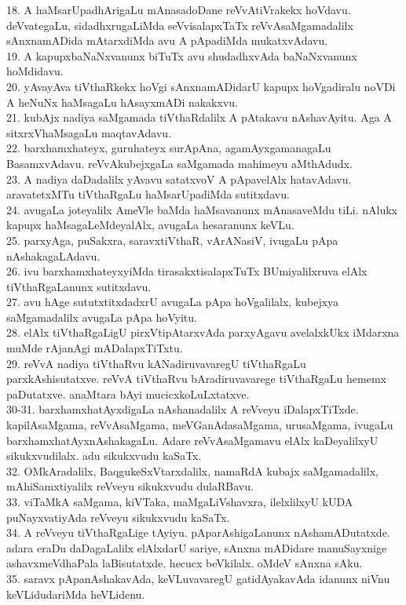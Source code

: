 \documentclass{article}
\begin{document}
18. A haMsarUpadhArigaLu mAnasadoDane reVvAtiVrakekx hoVdavu. deVvategaLu, sidadhxrugaLiMda seVvisalapxTaTx reVvAsaMgamadalilx sAnxnamADida mAtarxdiMda avu A pApadiMda mukatxvAdavu.\\
19. A kapupxbaNaNxvanunx biTuTx avu shudadhxvAda baNaNxvanunx hoMdidavu.\\
20. yAvayAva tiVthaRkekx hoVgi sAnxnamADidarU kapupx hoVgadiralu noVDi A heNuNx haMsagaLu hAsayxmADi nakakxvu.\\
21. kubAjx nadiya saMgamada tiVthaRdalilx A pAtakavu nAshavAyitu. Aga A sitxrxVhaMsagaLu maqtavAdavu.\\
22. barxhamxhateyx, guruhateyx surApAna, agamAyxgamanagaLu BasamxvAdavu. reVvAkubejxgaLa saMgamada mahimeyu aMthAdudx.\\
23. A nadiya daDadalilx yAvavu satatxvoV A pApavelAlx hatavAdavu. aravatetxMTu tiVthaRgaLu haMsarUpadiMda sutitxdavu.\\
24. avugaLa joteyalilx AmeVle baMda haMsavanunx mAnasaveMdu tiLi. nAlukx kapupx haMsagaLeMdeyalAlx, avugaLa hesaranunx keVLu.\\
25. parxyAga, puSakxra, saravxtiVthaR, vArANasiV, ivugaLu pApa nAshakagaLAdavu.\\
26. ivu barxhamxhateyxyiMda tirasakxtisalapxTuTx BUmiyalilxruva elAlx tiVthaRgaLanunx sutitxdavu.\\
27. avu hAge sututxtitxdadxrU avugaLa pApa hoVgalilalx, kubejxya saMgamadalilx avugaLa pApa hoVyitu.\\
28. elAlx tiVthaRgaLigU pirxVtipAtarxvAda parxyAgavu avelalxkUkx iMdarxna muMde rAjanAgi mADalapxTiTxtu.\\
29. reVvA nadiya tiVthaRvu kANadiruvavaregU tiVthaRgaLu parxkAshisutatxve. reVvA tiVthaRvu bAradiruvavarege tiVthaRgaLu hememx paDutatxve. anaMtara bAyi mucicxkoLuLxtatxve.\\
30-31. barxhamxhatAyxdigaLa nAshanadalilx A reVveyu iDalapxTiTxde. kapilAsaMgama, reVvAsaMgama, meVGanAdasaMgama, urusaMgama, ivugaLu barxhamxhatAyxnAshakagaLu. Adare reVvAsaMgamavu elAlx kaDeyalilxyU sikukxvudilalx. adu sikukxvudu kaSaTx.\\
32. OMkAradalilx, BaqgukeSxVtarxdalilx, namaRdA kubajx saMgamadalilx, mAhiSamxtiyalilx reVveyu sikukxvudu dulaRBavu.\\
33. viTaMkA saMgama, kiVTaka, maMgaLiVshavxra, ilelxlilxyU kUDA puNayxvatiyAda reVveyu sikukxvudu kaSaTx.\\
34. A reVveyu tiVthaRgaLige tAyiyu. pAparAshigaLanunx nAshamADutatxde. adara eraDu daDagaLalilx elAlxdarU sariye, sAnxna mADidare manuSayxnige ashavxmeVdhaPala laBisutatxde. hecucx beVkilalx. oMdeV sAnxna sAku.\\
35. saravx pApanAshakavAda, keVLuvavaregU gatidAyakavAda idanunx niVnu keVLidudariMda heVLidenu.
\end{document}

